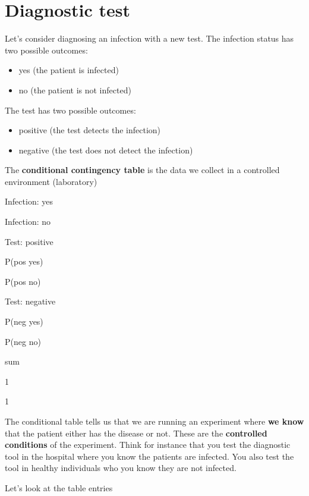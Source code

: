 \documentclass[
]{book}
\providecommand{\tightlist}{%
  \setlength{\itemsep}{0pt}\setlength{\parskip}{0pt}}
\begin{document}
\hypertarget{diagnostic-test}{%
\section{Diagnostic test}\label{diagnostic-test}}

Let's consider diagnosing an infection with a new test. The infection status has two possible outcomes:

\begin{itemize}
\tightlist
\item
  yes (the patient is infected)
\item
  no (the patient is not infected)
\end{itemize}

The test has two possible outcomes:

\begin{itemize}
\tightlist
\item
  positive (the test detects the infection)
\item
  negative (the test does not detect the infection)
\end{itemize}

The \textbf{conditional contingency table} is the data we collect in a controlled environment (laboratory)

Infection: yes

Infection: no

Test: positive

P(pos {\textbar{}} yes)

P(pos {\textbar{}} no)

Test: negative

P(neg {\textbar{}} yes)

P(neg {\textbar{}} no)

sum

1

1

The conditional table tells us that we are running an experiment where \textbf{we know} that the patient either has the disease or not. These are the \textbf{controlled conditions} of the experiment. Think for instance that you test the diagnostic tool in the hospital where you know the patients are infected. You also test the tool in healthy individuals who you know they are not infected.

Let's look at the table entries
\end{document}
